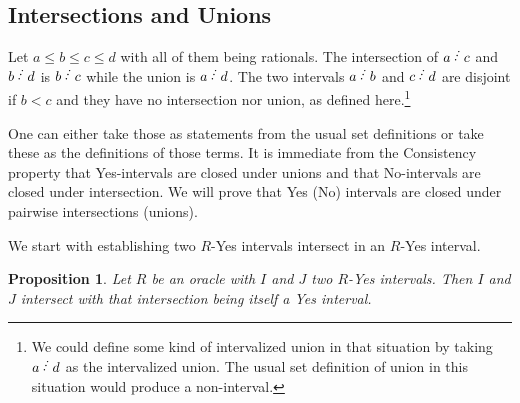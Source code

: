 \documentclass[12pt]{article}
\newtheorem{proposition}{Proposition}[subsection]
\begin{document}
\subsection{Intersections and Unions}

Let $a \leq b \leq c \leq d$ with all of them being rationals. The intersection of $a\lte c$ and $b\lte d$ is $b\lte c$ while the union is $a\lte d$. The two intervals $a\lte b$ and $c\lte d$ are disjoint if $b < c$ and they have no intersection nor union, as defined here.\footnote{We could define some kind of intervalized union in that situation by taking $a \lte d$ as the intervalized union. The usual set definition of union in this situation would produce a non-interval.}

One can either take those as statements from the usual set definitions or take these as the definitions of those terms. It is immediate from the Consistency property that Yes-intervals are closed under unions and that No-intervals are closed under intersection. We will prove that Yes (No) intervals are closed under pairwise intersections (unions). 

We start with establishing two $R$-Yes intervals intersect in an $R$-Yes interval.

\begin{proposition}\label{pr:inter}
Let $R$ be an oracle with $I$ and $J$ two $R$-Yes intervals. Then $I$ and $J$ intersect with that intersection being itself a Yes interval. 
\end{proposition}
\end{document}
